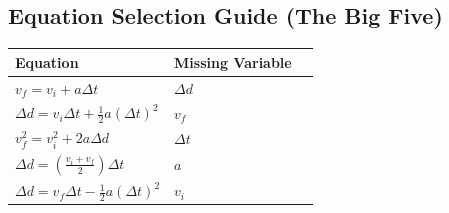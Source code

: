 \documentclass{article}
\begin{document}
\subsection*{Equation Selection Guide (The Big Five)}
\begin{table}[h]
  \centering
  \begin{tabular}{llc}
    \toprule
    \textbf{Equation} & \textbf{Missing Variable} \\ \midrule
    $v_f = v_i + a\Delta t$ & $\Delta d$ \\
    $\Delta d = v_i\Delta t + \frac{1}{2}a(\Delta t)^2$ & $v_f$ \\
    $v_f^2 = v_i^2 + 2a\Delta d$ & $\Delta t$ \\
    $\Delta d = \left( \frac{v_i + v_f}{2} \right) \Delta t$ & $a$ \\
    $\Delta d = v_f \Delta t - \frac{1}{2}a(\Delta t)^2$ & $v_i$ \\ \bottomrule
  \end{tabular}
\end{table}
\end{document}
